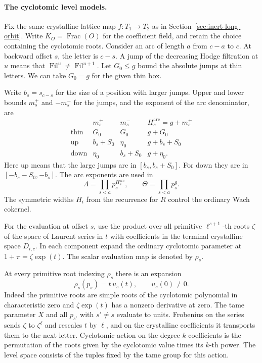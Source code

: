 \paragraph{The cyclotomic level models.}\label{par:wach-level-models}
Fix the same crystalline lattice map \(f:T_1\to T_2\) as in
Section~\ref{sec:inert-long-orbit}. Write \(K_O=\operatorname{Frac}(O)\)
for the coefficient field, and retain the choice containing the
cyclotomic roots. Consider an arc of length \(a\) from \(c-a\) to
\(c\). At backward offset \(s\), the letter is \(c-s\). A jump of
the decreasing Hodge filtration at \(u\) means that
\(\operatorname{Fil}^u\ne\operatorname{Fil}^{u+1}\).
Let \(G_0\le g\) bound the absolute jumps at thin letters. We
can take \(G_0=g\) for the given thin box.

Write \(b_s=s_{c-s}\)
for the size of a position with larger jumps. Upper and lower bounds \(m_s^+\)
and \(-m_s^-\) for the jumps, and the exponent of the arc
denominator, are
\[
\begin{array}{c|ccc}
 & m_s^+ & m_s^- & H_s^{\mathrm{arc}}=g+m_s^+\\ \hline
 \text{thin} &G_0&G_0&g+G_0\\
 \text{up}   &b_s+S_0&\eta_0&g+b_s+S_0\\
 \text{down} &\eta_0&b_s+S_0&g+\eta_0 .
\end{array}
\]
Here up means that the large jumps are in \([b_s,b_s+S_0]\).
For down they are in \([-b_s-S_0,-b_s]\).
The arc exponents are used in
\[
 \Lambda=\prod_{s<a}p_s^{H_s^{\mathrm{arc}}},\qquad
 \Theta=\prod_{s<a}p_s^g .
\]
The symmetric widths \(H_i\) from the recurrence for \(R\) control
the ordinary Wach cokernel.

For the evaluation at offset \(s\), use the product over all
primitive \(\ell^{s+1}\)-th roots \(\zeta\) of the space of Laurent
series in \(t\) with coefficients in the terminal crystalline
space \(D_{i,c}\). In each component expand the ordinary
cyclotomic parameter at \(1+\pi=\zeta\exp(t)\).
The scalar evaluation map is denoted by \(\rho_s\).

At every primitive root indexing \(\rho_s\) there is an expansion
\[
 \rho_s(p_s)=t\,u_s(t),\qquad u_s(0)\ne0.
\]
Indeed the primitive roots are simple
roots of the cyclotomic polynomial in characteristic zero and
\(\zeta\exp(t)\) has a nonzero derivative at zero.
The tame parameter \(X\) and all \(p_{s'}\) with \(s'\ne s\)
evaluate to units. Frobenius on the series sends
\(\zeta\) to \(\zeta^\ell\) and rescales \(t\) by \(\ell\),
and on the crystalline coefficients it transports them to the
next letter. Cyclotomic action on the degree \(k\) coefficients
is the permutation of the roots given by the cyclotomic value
times its \(k\)-th power. The level space consists of the tuples
fixed by the tame group for this action.

